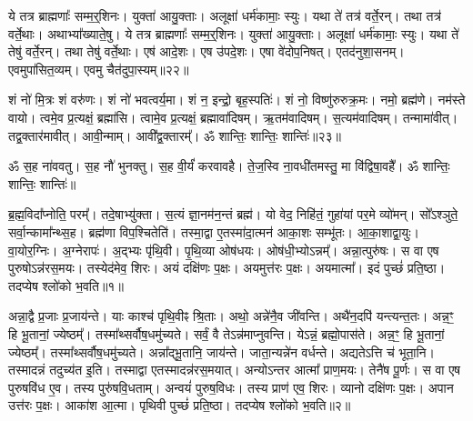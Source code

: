 ये तत्र ब्राह्मणाः᳚ सम्म॒र्॒\mbox{}शिनः। 
युक्ता॑ आयु॒क्ताः। 
अलूक्षा॑ धर्म॑कामाः॒ स्युः। 
यथा ते॑ तत्र॑ वर्ते॒रन्। 
तथा तत्र॑ वर्ते॒थाः। 
अथाभ्या᳚ख्याते॒षु। 
ये तत्र ब्राह्मणाः᳚ सम्म॒र्॒\mbox{}शिनः। 
युक्ता॑ आयु॒क्ताः। 
अलूक्षा॑ धर्म॑कामाः॒ स्युः। 
यथा ते॑ तेषु॑ वर्ते॒रन्। 
तथा तेषु॑ वर्ते॒थाः। 
एष॑ आदे॒शः। 
एष उ॑पदे॒शः। 
एषा वे॑दोप॒निषत्। 
एतद॑नुशा॒सनम्। 
एवमुपा॑सित॒व्यम्। 
एवमु चैत॑दुपा॒स्यम्॥२२॥
\anuvakamend[स्वाध्यायप्रवचनाभ्यान्न प्रम॑दित॒व्यं तानि त्वयो॑पास्या॒नि स्यात्तेषु॑ वर्ते॒रन्थ्स॒प्त च॑]

शं नो॑ मि॒त्रः शं वरु॑णः। 
शं नो॑ भवत्वर्य॒मा। 
शं न॒ इन्द्रो॒ बृह॒स्पतिः॑। 
शं नो॒ विष्णु॑रुरुक्र॒मः। 
नमो॒ ब्रह्म॑णे। 
नम॑स्ते वायो। 
त्वमे॒व प्र॒त्यक्षं॒ ब्रह्मा॑सि। 
त्वामे॒व प्र॒त्यक्षं॒ ब्रह्मावा॑दिषम्। 
ऋ॒तम॑वादिषम्। 
स॒त्यम॑वादिषम्। 
तन्मामा॑वीत्। 
तद्व॒क्तार॑मावीत्। 
आवी॒न्माम्। 
आवी᳚द्व॒क्तारम्᳚। 
ॐ शान्तिः॒ शान्तिः॒ शान्तिः॑॥२३॥
\anuvakamend[स॒त्यम॑वादिषं॒ पञ्च॑ च]


\setcounter{anuvakam}{0}
ॐ स॒ह ना॑ववतु। 
स॒ह नौ॑ भुनक्तु। 
स॒ह वी॒र्यं॑ करवावहै। 
ते॒ज॒स्वि ना॒वधी॑तमस्तु॒ मा वि॑द्विषा॒वहै᳚। 
ॐ शान्तिः॒ शान्तिः॒ शान्तिः॑॥%


ब्र॒ह्म॒विदा᳚प्नोति॒ परम्᳚। 
तदे॒षाभ्यु॑क्ता। 
स॒त्यं ज्ञा॒नम॑न॒न्तं ब्रह्म॑। 
यो वेद॒ निहि॑तं॒ गुहा॑यां पर॒मे व्यो॑मन्। 
सो᳚ऽश्ञुते॒ सर्वा॒न्कामा᳚न्थ्स॒ह। 
ब्रह्म॑णा विप॒श्चितेति॑। 
तस्मा॒द्वा ए॒तस्मा॑दा॒त्मन॑ आका॒शः सम्भू॑तः। 
आ॒का॒शाद्वा॒युः। 
वा॒योर॒ग्निः। 
अ॒ग्नेरापः॑। 
अ॒द्भ्यः पृ॑थि॒वी। 
पृ॒थि॒व्या ओष॑धयः। 
ओष॑धी॒भ्योऽन्नम्᳚। 
अन्ना॒त्पुरु॑षः। 
स वा एष पुरुषोऽन्न॑रस॒मयः। 
तस्येद॑मेव॒ शिरः। 
अयं दक्षि॑णः प॒क्षः। 
अयमुत्त॑रः प॒क्षः। 
अयमात्मा᳚। 
इदं पुच्छं॑ प्रति॒ष्ठा। 
तदप्येष श्लो॑को भ॒वति॥१॥

अन्ना॒द्वै प्र॒जाः प्र॒जाय॑न्ते। 
याः काश्च॑ पृथि॒वीꣴ श्रि॒ताः। 
अथो॒ अन्ने॑नै॒व जी॑वन्ति। 
अथै॑न॒दपि॑ यन्त्यन्त॒तः। 
अन्न॒ꣳ॒ हि भू॒तानां॒ ज्येष्ठम्᳚। 
तस्मा᳚थ्सर्वौष॒धमु॑च्यते। 
सर्वं॒ वै तेऽन्न॑माप्नुवन्ति। 
येऽन्नं॒ ब्रह्मो॒पास॑ते। 
अन्न॒ꣳ॒ हि भू॒तानां॒ ज्येष्ठम्᳚। 
तस्मा᳚थ्सर्वौष॒धमु॑च्यते। 
अन्ना᳚द्भू॒तानि॒ जाय॑न्ते। 
जाता॒न्यन्ने॑न वर्धन्ते। 
अद्यतेऽत्ति च॑ भूता॒नि। 
तस्मादन्नं तदुच्य॑त इ॒ति। 
तस्माद्वा एतस्मादन्न॑रस॒मयात्। 
अन्योऽन्तर आत्मा᳚ प्राण॒मयः। 
तेनै॑ष पू॒र्णः। 
स वा एष पुरुषवि॑ध ए॒व। 
तस्य पुरु॑षवि॒धताम्। 
अन्वयं॑ पुरुष॒विधः। 
तस्य प्राण॑ एव॒ शिरः। 
व्यानो दक्षि॑णः प॒क्षः। 
अपान उत्त॑रः प॒क्षः। 
आका॑श आ॒त्मा। 
पृथिवी पुच्छं॑ प्रति॒ष्ठा। 
तदप्येष श्लो॑को भ॒वति॥२॥

